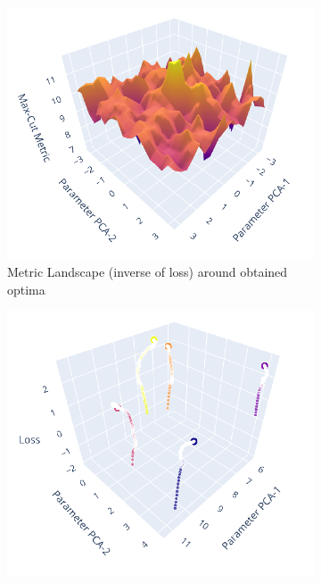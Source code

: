 \begin{figure}[htp]
    \centering
    \begin{subfigure}[b]{0.32\linewidth}
        \includegraphics[width=\textwidth]{figures/qleet/supplementary-qleet-1.pdf}
        \caption{Metric Landscape (inverse of loss) around obtained optima}
    \end{subfigure}
    \begin{subfigure}[b]{0.32\linewidth}
        \includegraphics[width=\textwidth]{figures/qleet/supplementary-qleet-2.pdf}

\end{subfigure}
\end{figure}
